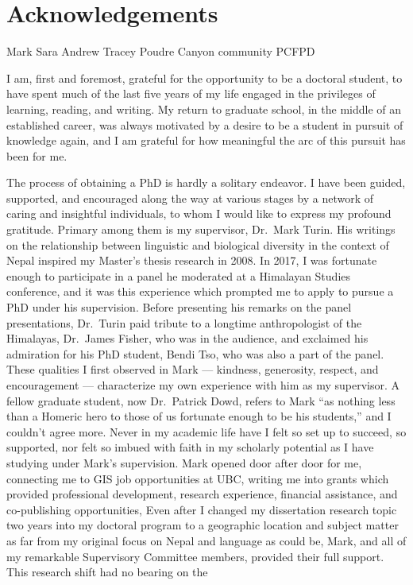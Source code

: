 \documentclass[
]{article}
\begin{document}
\clearpage

\section*{Acknowledgements}

Mark
Sara
Andrew
Tracey
Poudre Canyon community
PCFPD

I am, first and foremost, grateful for the opportunity to be a doctoral student, to have spent much of the last five years of my life engaged in the privileges of learning, reading, and writing. My return to graduate school, in the middle of an established career, was always motivated by a desire to be a student in pursuit of knowledge again, and I am grateful for how meaningful the arc of this pursuit has been for me.

The process of obtaining a PhD is hardly a solitary endeavor. I have been guided, supported, and encouraged along the way at various stages by a network of caring and insightful individuals, to whom I would like to express my profound gratitude. Primary among them is my supervisor, Dr.~Mark Turin. His writings on the relationship between linguistic and biological diversity in the context of Nepal inspired my Master's thesis research in 2008. In 2017, I was fortunate enough to participate in a panel he moderated at a Himalayan Studies conference, and it was this experience which prompted me to apply to pursue a PhD under his supervision. Before presenting his remarks on the panel presentations, Dr.~Turin paid tribute to a longtime anthropologist of the Himalayas, Dr.~James Fisher, who was in the audience, and exclaimed his admiration for his PhD student, Bendi Tso, who was also a part of the panel. These qualities I first observed in Mark --- kindness, generosity, respect, and encouragement --- characterize my own experience with him as my supervisor. A fellow graduate student, now Dr.~Patrick Dowd, refers to Mark ``as nothing less than a Homeric hero to those of us fortunate enough to be his students,'' and I couldn't agree more. Never in my academic life have I felt so set up to succeed, so supported, nor felt so imbued with faith in my scholarly potential as I have studying under Mark's supervision. Mark opened door after door for me, connecting me to GIS job opportunities at UBC, writing me into grants which provided professional development, research experience, financial assistance, and co-publishing opportunities, Even after I changed my dissertation research topic two years into my doctoral program to a geographic location and subject matter as far from my original focus on Nepal and language as could be, Mark, and all of my remarkable Supervisory Committee members, provided their full support. This research shift had no bearing on the
\end{document}
